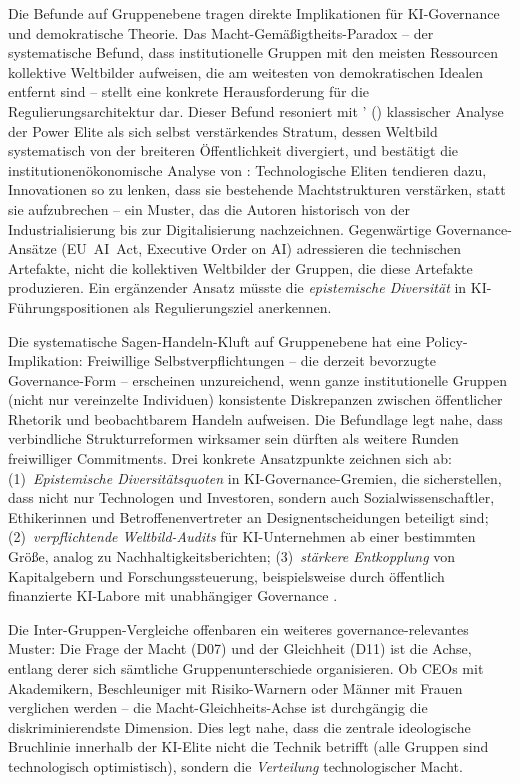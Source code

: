 \documentclass[12pt,a4paper]{article}
\begin{document}
Die Befunde auf Gruppenebene tragen direkte Implikationen f\"ur KI-Governance und demokratische Theorie. Das Macht-Gem\"a\ss{}igtheits-Paradox -- der systematische Befund, dass institutionelle Gruppen mit den meisten Ressourcen kollektive Weltbilder aufweisen, die am weitesten von demokratischen Idealen entfernt sind -- stellt eine konkrete Herausforderung f\"ur die Regulierungsarchitektur dar. Dieser Befund resoniert mit \citeauthor{Mills1956}' (\citeyear{Mills1956}) klassischer Analyse der \glqq Power Elite\grqq{} als sich selbst verst\"arkendes Stratum, dessen Weltbild systematisch von der breiteren \"Offentlichkeit divergiert, und best\"atigt die institutionen\"okonomische Analyse von \citet{AcemogluJohnson2023}: Technologische Eliten tendieren dazu, Innovationen so zu lenken, dass sie bestehende Machtstrukturen verst\"arken, statt sie aufzubrechen -- ein Muster, das die Autoren historisch von der Industrialisierung bis zur Digitalisierung nachzeichnen. Gegenw\"artige Governance-Ans\"atze (EU~AI~Act, Executive Order on AI) adressieren die technischen Artefakte, nicht die kollektiven Weltbilder der Gruppen, die diese Artefakte produzieren. Ein erg\"anzender Ansatz m\"usste die \emph{epistemische Diversit\"at} in KI-F\"uhrungspositionen als Regulierungsziel anerkennen.

Die systematische Sagen-Handeln-Kluft auf Gruppenebene hat eine Policy-Implikation: Freiwillige Selbstverpflichtungen -- die derzeit bevorzugte Governance-Form \citep[vgl.][]{Bengio2024} -- erscheinen unzureichend, wenn ganze institutionelle Gruppen (nicht nur vereinzelte Individuen) konsistente Diskrepanzen zwischen \"offentlicher Rhetorik und beobachtbarem Handeln aufweisen. Die Befundlage legt nahe, dass verbindliche Strukturreformen wirksamer sein d\"urften als weitere Runden freiwilliger Commitments. Drei konkrete Ansatzpunkte zeichnen sich ab: (1)~\emph{Epistemische Diversit\"atsquoten} in KI-Governance-Gremien, die sicherstellen, dass nicht nur Technologen und Investoren, sondern auch Sozialwissenschaftler, Ethikerinnen und Betroffenenvertreter an Designentscheidungen beteiligt sind; (2)~\emph{verpflichtende Weltbild-Audits} f\"ur KI-Unternehmen ab einer bestimmten Gr\"o\ss{}e, analog zu Nachhaltigkeitsberichten; (3)~\emph{st\"arkere Entkopplung} von Kapitalgebern und Forschungssteuerung, beispielsweise durch \"offentlich finanzierte KI-Labore mit unabh\"angiger Governance \citep[vgl.][]{AcemogluJohnson2023}.

Die Inter-Gruppen-Vergleiche offenbaren ein weiteres governance-relevantes Muster: Die Frage der Macht (D07) und der Gleichheit (D11) ist die Achse, entlang derer sich s\"amtliche Gruppenunterschiede organisieren. Ob CEOs mit Akademikern, Beschleuniger mit Risiko-Warnern oder M\"anner mit Frauen verglichen werden -- die Macht-Gleichheits-Achse ist durchg\"angig die diskriminierendste Dimension. Dies legt nahe, dass die zentrale ideologische Bruchlinie innerhalb der KI-Elite nicht die Technik betrifft (alle Gruppen sind technologisch optimistisch), sondern die \emph{Verteilung} technologischer Macht.
\end{document}
